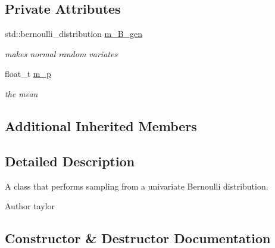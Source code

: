\subsection*{Private Attributes}
\begin{DoxyCompactItemize}
\item 
\mbox{\label{classrvsamp_1_1BernSampler_af9b28903cd86a0f02cece4a8c407f4ed}} 
std\+::bernoulli\+\_\+distribution \hyperlink{classrvsamp_1_1BernSampler_af9b28903cd86a0f02cece4a8c407f4ed}{m\+\_\+\+B\+\_\+gen}
\begin{DoxyCompactList}\small\item\em makes normal random variates \end{DoxyCompactList}\item 
\mbox{\label{classrvsamp_1_1BernSampler_a813e9f2491074c5df44154b83698091b}} 
float\+\_\+t \hyperlink{classrvsamp_1_1BernSampler_a813e9f2491074c5df44154b83698091b}{m\+\_\+p}
\begin{DoxyCompactList}\small\item\em the mean \end{DoxyCompactList}\end{DoxyCompactItemize}
\subsection*{Additional Inherited Members}


\subsection{Detailed Description}
A class that performs sampling from a univariate Bernoulli distribution. 

\begin{DoxyAuthor}{Author}
taylor 
\end{DoxyAuthor}


\subsection{Constructor \& Destructor Documentation}
\mbox{\label{classrvsamp_1_1BernSampler_ab71d1320b26f2ea63b1a7adc4183db3b}} 
